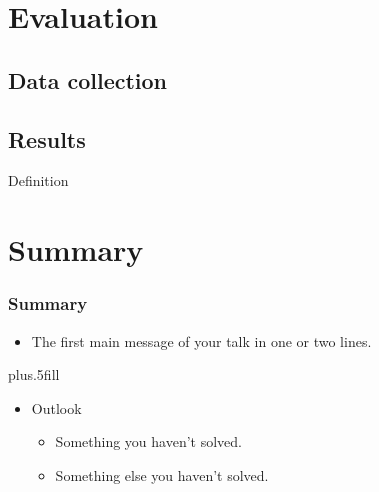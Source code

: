 \documentclass[pdftex, handout]{beamer}
\begin{document}
\section{Evaluation}

\subsection{Data collection}

\begin{frame}
\end{frame}

\begin{frame}
\end{frame}


\subsection{Results}

\begin{frame}
\end{frame}

\begin{frame}
\end{frame}

\begin{frame}{Definition}
\end{frame}


\section*{Summary}

\begin{frame}
  \frametitle<presentation>{Summary}

  \begin{itemize}
  \item The \alert{first main message} of your talk in one or two lines.
  \end{itemize}

  \vskip0pt plus.5fill
  \begin{itemize}
  \item Outlook
    \begin{itemize}
    \item Something you haven't solved.
    \item Something else you haven't solved.
    \end{itemize}
  \end{itemize}
\end{frame}
\end{document}
